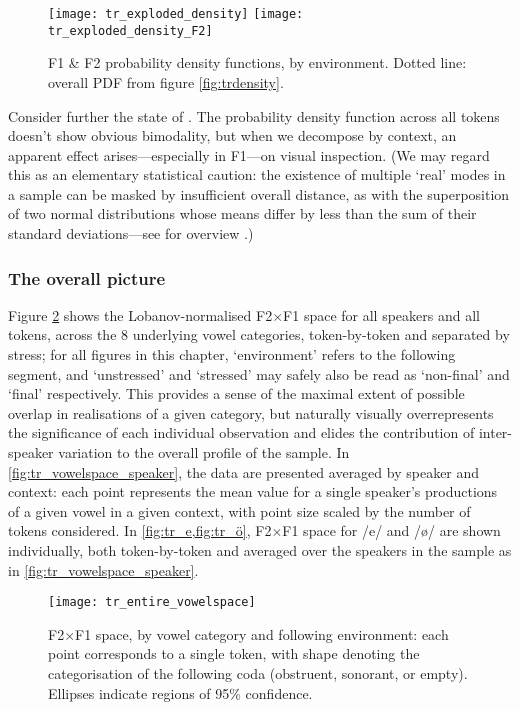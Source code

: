 \begin{figure}[H]
  \texttt{[image: tr\_exploded\_density]}
    \hfill
  \texttt{[image: tr\_exploded\_density\_F2]}
  \caption[F1 \& F2 probability density functions, by environment.]{F1 \& F2 probability density functions, by environment. Dotted line: overall PDF from figure \ref{fig:trdensity}.}
  \label{fig:trexploded}
\end{figure}

Consider further the state of \ur{\o}. The probability density function across all tokens doesn't show obvious bimodality, but when we decompose by context, an apparent effect arises---especially in F1---on visual inspection. (We may regard this as an elementary statistical caution: the existence of multiple `real' modes in a sample can be masked by insufficient overall distance, as with the superposition of two normal distributions whose means differ by less than the sum of their standard deviations---see for overview \citealt{Schilling2002}.)

\subsubsection{The overall picture}

Figure \ref{fig:tr_vowelspace} shows the Lobanov-normalised F2$\times$F1 space for all speakers and all tokens, across the 8 underlying vowel categories, token-by-token and separated by stress; for all figures in this chapter, `environment' refers to the following segment, and `unstressed' and `stressed' may safely also be read as `non-final' and `final' respectively. This provides a sense of the maximal extent of possible overlap in realisations of a given category, but naturally visually overrepresents the significance of each individual observation and elides the contribution of inter-speaker variation to the overall profile of the sample. In \cref{fig:tr_vowelspace_speaker}, the data are presented averaged by speaker and context: each point represents the mean value for a single speaker's productions of a given vowel in a given context, with point size scaled by the number of tokens considered. In \cref{fig:tr_e,fig:tr_ö}, F2$\times$F1 space for /e/ and /\o/ are shown individually, both token-by-token and averaged over the speakers in the sample as in \cref{fig:tr_vowelspace_speaker}.

\begin{figure}[H]
  \centering
  \texttt{[image: tr\_entire\_vowelspace]}
  \caption[F2$\times$F1 space, by vowel category and following environment.]{F2$\times$F1 space, by vowel category and following environment: each point corresponds to a single token, with shape denoting the categorisation of the following coda (obstruent, sonorant, or empty). Ellipses indicate regions of 95\% confidence. }
  \label{fig:tr_vowelspace}
\end{figure}


